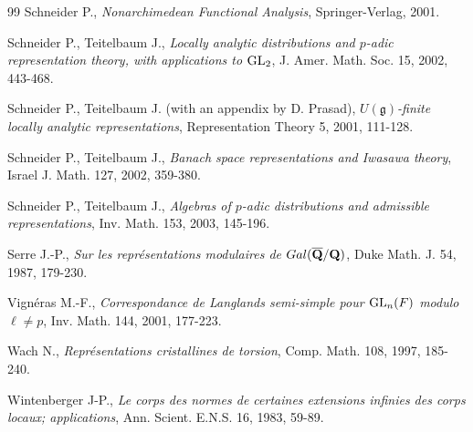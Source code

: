 \documentclass[11pt]{amsart}
\begin{document}
\begin{thebibliography}{99}
 Schneider P., {\it Nonarchimedean Functional Analysis},
  Springer-Verlag, 2001.
 

 Schneider P., Teitelbaum J., {\it Locally analytic
  distributions and $p$-adic representation theory, with applications
  to ${\rm GL}_{2}$}, J. Amer. Math. Soc. 15, 2002, 443-468.
 

 Schneider P., Teitelbaum J. (with an appendix by
  D. Prasad), {\it $U(\mathfrak g)$-finite locally analytic
    representations}, Representation Theory 5, 2001, 111-128.
 

 Schneider P., Teitelbaum J., {\it Banach space
  representations and Iwasawa theory}, Israel J. Math. 127, 2002,
  359-380.
 

 Schneider P., Teitelbaum J., {\it Algebras of $p$-adic
  distributions and admissible representations}, Inv. Math. 153, 2003,
  145-196.
 

 Serre J.-P., {\it Sur les repr\'esentations modulaires de
  $Gal(\overline {\bf Q}/{\bf Q})$}, Duke Math. J. 54, 1987, 179-230.
  

 Vign\'eras M.-F., {\it Correspondance de Langlands
  semi-simple pour ${\rm GL}_n(F)$ modulo $\ell\ne p$},
  Inv. Math. 144, 2001, 177-223. 
 
 Wach N., {\it Repr\'esentations cristallines de torsion}, Comp. Math. 
108, 1997, 185-240. 
  
 Wintenberger J-P., {\it Le corps des normes de
  certaines extensions infinies des corps locaux; applications},
  Ann. Scient. E.N.S. 16, 1983, 59-89.  
\end{thebibliography} 
\end{document}
